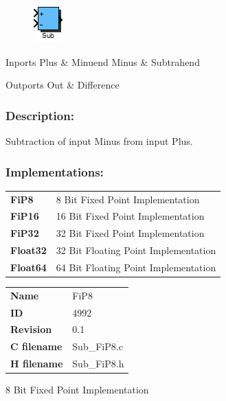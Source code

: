\label{block:Sub}
\begin{figure}[H]\includegraphics{Sub}\end{figure} 

\begin{XtoCtabular}{Inports}
Plus & Minuend\tabularnewline
\hline
Minus & Subtrahend\tabularnewline
\hline
\end{XtoCtabular}


\begin{XtoCtabular}{Outports}
Out & Difference\tabularnewline
\hline
\end{XtoCtabular}

\subsubsection*{Description:}
Subtraction of input Minus from input Plus.


\subsubsection*{Implementations:}
\begin{tabular}{l l}
\textbf{FiP8} & 8 Bit Fixed Point Implementation\tabularnewline
\textbf{FiP16} & 16 Bit Fixed Point Implementation\tabularnewline
\textbf{FiP32} & 32 Bit Fixed Point Implementation\tabularnewline
\textbf{Float32} & 32 Bit Floating Point Implementation\tabularnewline
\textbf{Float64} & 64 Bit Floating Point Implementation\tabularnewline
\end{tabular}

\nopagebreak[0]
\begin{tabular}{l l}
\textbf{Name} & FiP8 \tabularnewline
\textbf{ID} & 4992 \tabularnewline
\textbf{Revision} & 0.1 \tabularnewline
\textbf{C filename} & Sub\_FiP8.c \tabularnewline
\textbf{H filename} & Sub\_FiP8.h \tabularnewline
\end{tabular}
\vspace{1ex}

8 Bit Fixed Point Implementation


